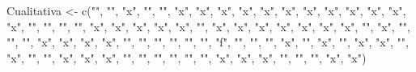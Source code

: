 \documentclass[
]{article}
\newenvironment{Shaded}{\begin{snugshade}}{\end{snugshade}}
\newcommand{\FunctionTok}[1]{\textcolor[rgb]{0.00,0.00,0.00}{#1}}
\newcommand{\NormalTok}[1]{#1}
\newcommand{\OtherTok}[1]{\textcolor[rgb]{0.56,0.35,0.01}{#1}}
\newcommand{\StringTok}[1]{\textcolor[rgb]{0.31,0.60,0.02}{#1}}
\begin{document}
\begin{Shaded}
\begin{Highlighting}[]
\NormalTok{Cualitativa }\OtherTok{\textless{}{-}} \FunctionTok{c}\NormalTok{(}\StringTok{""}\NormalTok{, }\StringTok{""}\NormalTok{, }\StringTok{"x"}\NormalTok{, }\StringTok{""}\NormalTok{, }\StringTok{""}\NormalTok{, }\StringTok{"x"}\NormalTok{, }\StringTok{"x"}\NormalTok{, }\StringTok{"x"}\NormalTok{, }\StringTok{"x"}\NormalTok{, }\StringTok{"x"}\NormalTok{, }\StringTok{"x"}\NormalTok{, }\StringTok{"x"}\NormalTok{, }\StringTok{"x"}\NormalTok{, }\StringTok{"x"}\NormalTok{, }\StringTok{"x"}\NormalTok{, }\StringTok{"x"}\NormalTok{, }\StringTok{"x"}\NormalTok{, }\StringTok{""}\NormalTok{, }\StringTok{""}\NormalTok{, }\StringTok{""}\NormalTok{, }\StringTok{""}\NormalTok{, }\StringTok{"x"}\NormalTok{, }\StringTok{"x"}\NormalTok{, }\StringTok{"x"}\NormalTok{, }\StringTok{"x"}\NormalTok{, }\StringTok{"x"}\NormalTok{, }\StringTok{""}\NormalTok{, }\StringTok{"x"}\NormalTok{, }\StringTok{"x"}\NormalTok{, }\StringTok{"x"}\NormalTok{, }\StringTok{"x"}\NormalTok{, }\StringTok{"x"}\NormalTok{, }\StringTok{"x"}\NormalTok{, }\StringTok{"x"}\NormalTok{, }\StringTok{""}\NormalTok{, }\StringTok{"x"}\NormalTok{, }\StringTok{""}\NormalTok{, }\StringTok{""}\NormalTok{, }\StringTok{""}\NormalTok{, }\StringTok{"x"}\NormalTok{, }\StringTok{"x"}\NormalTok{, }\StringTok{"x"}\NormalTok{, }\StringTok{"x"}\NormalTok{, }\StringTok{""}\NormalTok{, }\StringTok{""}\NormalTok{, }\StringTok{""}\NormalTok{, }\StringTok{""}\NormalTok{, }\StringTok{""}\NormalTok{, }\StringTok{""}\NormalTok{, }\StringTok{"f"}\NormalTok{, }\StringTok{""}\NormalTok{, }\StringTok{""}\NormalTok{, }\StringTok{""}\NormalTok{, }\StringTok{"x"}\NormalTok{, }\StringTok{""}\NormalTok{, }\StringTok{"x"}\NormalTok{, }\StringTok{""}\NormalTok{, }\StringTok{"x"}\NormalTok{, }\StringTok{"x"}\NormalTok{, }\StringTok{""}\NormalTok{, }\StringTok{"x"}\NormalTok{, }\StringTok{""}\NormalTok{, }\StringTok{""}\NormalTok{, }\StringTok{"x"}\NormalTok{, }\StringTok{"x"}\NormalTok{, }\StringTok{"x"}\NormalTok{, }\StringTok{""}\NormalTok{, }\StringTok{""}\NormalTok{, }\StringTok{""}\NormalTok{, }\StringTok{""}\NormalTok{, }\StringTok{""}\NormalTok{, }\StringTok{""}\NormalTok{, }\StringTok{"x"}\NormalTok{, }\StringTok{"x"}\NormalTok{, }\StringTok{"x"}\NormalTok{, }\StringTok{""}\NormalTok{, }\StringTok{""}\NormalTok{, }\StringTok{""}\NormalTok{, }\StringTok{"x"}\NormalTok{, }\StringTok{"x"}\NormalTok{)}

\end{Highlighting}
\end{Shaded}
\end{document}
